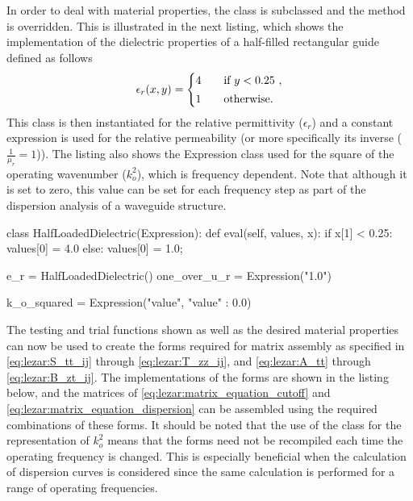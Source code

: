In order to deal with material properties, the  class
is subclassed and the  method is overridden. This is illustrated
in the next listing, which shows the implementation of the dielectric
properties of a half-filled rectangular guide defined as follows\vspace*{2pt}
\begin{equation}
\label{eq:lezar:half_filled_dielectric}
\epsilon_r (x,y) =
\begin{cases}
  4\quad &\text{if $y < 0.25$ },\\[2pt]
  1\quad &\text{otherwise}.\\
\end{cases}\vspace*{2pt}
\end{equation}
This class is then instantiated for the relative permittivity
($\epsilon_r$) and a constant expression is used for the relative
permeability (or more specifically its inverse ($\frac{1}{\mu_r}
= 1$)). The listing also shows the Expression class used for the
square of the operating wavenumber ($k_o^2$), which is frequency
dependent. Note that although it is set to zero, this value can
be set for each frequency step as part of the dispersion analysis of a
waveguide structure.\vspace*{2pt}

\begin{python}
class HalfLoadedDielectric(Expression):
    def eval(self, values, x):
        if x[1] < 0.25:
            values[0] = 4.0
        else:
            values[0] = 1.0;

e_r = HalfLoadedDielectric()
one_over_u_r = Expression("1.0")

k_o_squared = Expression("value", {"value" : 0.0})
\end{python}

\vspace*{5pt}

\noindent The testing and trial functions shown as well as the
desired material properties can now be used to create
the forms required for matrix assembly as specified in
\eqref{eq:lezar:S_tt_ij} through \eqref{eq:lezar:T_zz_ij}, and
\eqref{eq:lezar:A_tt} through \eqref{eq:lezar:B_zt_ij}. The
implementations of the forms are shown in the listing below,
and the matrices of \eqref{eq:lezar:matrix_equation_cutoff} and
\eqref{eq:lezar:matrix_equation_dispersion} can be assembled using the
required combinations of these forms. It should be noted that the use of
the  class for the representation of $k_o^2$ means that the forms need
not be recompiled each time the operating frequency is changed. This
is especially beneficial when the calculation of dispersion curves
is considered since the same calculation is performed for a range of
operating frequencies.\vspace*{2pt}

